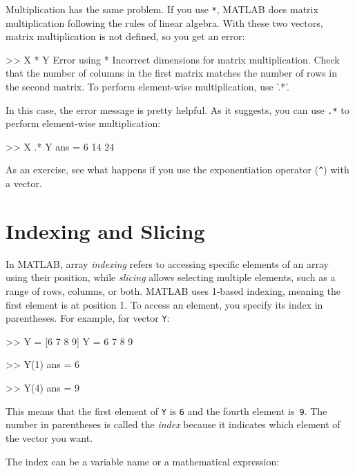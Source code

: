 \documentclass[../../book.tex]{subfiles}
\begin{document}
Multiplication has the same problem.  If you use \lstinline{*}, MATLAB does matrix multiplication following the rules of linear algebra.  With these two vectors, matrix multiplication is not defined, so you get an error:

\begin{code}
>> X * Y
Error using  *
Incorrect dimensions for matrix multiplication.
Check that the number of columns in the first matrix
matches the number of rows in the second matrix.
To perform element-wise multiplication, use '.*'.
\end{code}

In this case, the error message is pretty helpful.  As it suggests, you can use \lstinline{.*} to perform element-wise multiplication:


\begin{code}
>> X .* Y
ans = 6    14    24
\end{code}

As an exercise, see what happens if you use the exponentiation operator
(\lstinline{^}) with a vector.

\section{Indexing and Slicing}

In MATLAB, array \emph{indexing} refers to accessing specific elements of an array using their position, while \emph{slicing} allows selecting multiple elements, such as a range of rows, columns, or both.  MATLAB uses 1-based indexing, meaning the first element is at position 1. To access an element, you specify its index in parentheses. For example, for vector \lstinline{Y}:



\begin{code}
>> Y = [6 7 8 9]
Y = 6    7     8     9

>> Y(1)
ans = 6

>> Y(4)
ans = 9
\end{code}

This means that the first element of \lstinline{Y} is \lstinline{6} and the
fourth element is~\lstinline{9}.  
The number in parentheses is called the \emph{index} because it indicates which element of the vector you want.


The index can be a variable name or a mathematical expression:
\end{document}
